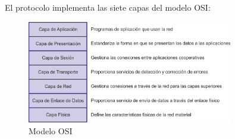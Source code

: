 El protocolo implementa las siete capas del modelo OSI:
\begin{figure}[htbp]
	\centering
		\includegraphics[width=0.80\textwidth]{imagenes/modelo_osi.png}
	\caption{Modelo OSI}
	\label{fig:modelo_osi}
\end{figure}



